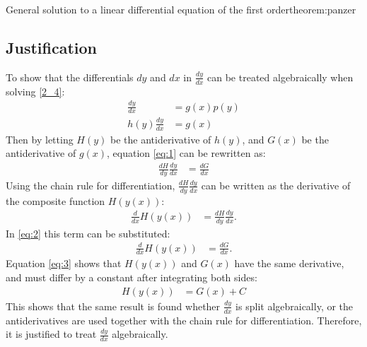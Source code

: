 \begin{theorem}{General solution to a linear differential equation of the first order}{theorem:panzer}
\subsection{Justification} 
To show that the differentials $dy$ and $dx$ in $\frac{dy}{dx}$ can be treated algebraically when solving \eqref{2_4}:
 \begin{align}
	\frac{dy}{dx} &= g(x)p(y)\nonumber\\
	h(y)\frac{dy}{dx} &= g(x)\label{eq:1}
 \end{align}
Then by letting $H(y)$ be the antiderivative of $h(y)$, and $G(x)$ be the antiderivative of $g(x)$, equation \eqref{eq:1} can be rewritten as: 
 \begin{align}
 	\frac{dH}{dy}\frac{dy}{dx} &= \frac{dG}{dx}\label{eq:2}
 \end{align}
Using the chain rule for differentiation, $\frac{dH}{dy}\frac{dy}{dx}$ can be written as the derivative of the composite function $H(y(x))$:
 \begin{align*}
	\frac{d}{dx} H(y(x)) &= \frac{dH}{dy}\frac{dy}{dx}.
 \end{align*}
In \ref{eq:2} this term can be substituted:
 \begin{align}
 	\frac{d}{dx}H(y(x)) &= \frac{dG}{dx}\label{eq:3}.
 \end{align}
Equation \ref{eq:3} shows that $H(y(x))$ and $G(x)$ have the same derivative, and must differ by a constant after integrating both sides:
 \begin{align*}
 	H(y(x)) &= G(x) + C
 \end{align*}
This shows that the same result is found whether $\frac{dy}{dx}$ is split algebraically, or the antiderivatives are used together with the chain rule for differentiation. Therefore, it is justified to treat $\frac{dy}{dx}$ algebraically.



\end{theorem}
